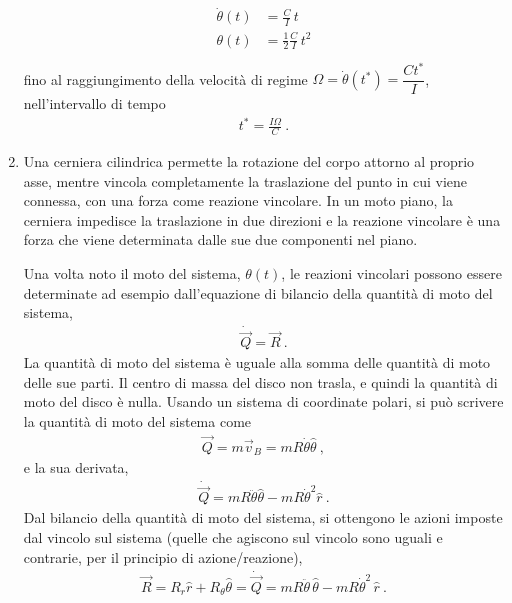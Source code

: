 \documentclass[letterpaper,10pt,italian]{jupyterBook}
\begin{document}
\begin{enumerate}
\begin{equation*}
\begin{split}
\begin{aligned}
     \dot{\theta}(t) & = \frac{C}{I} \, t \\
          \theta (t) & = \frac{1}{2} \frac{C}{I} \, t^2 \\
   \end{aligned}\end{split}
\end{equation*}
\sphinxAtStartPar
fino al raggiungimento della velocità di regime \(\Omega = \dot{\theta}(t^*) = \dfrac{C t^*}{I}\), nell’intervallo di tempo
\begin{equation*}
\begin{split}t^* = \frac{I \Omega}{C} \ .\end{split}
\end{equation*}
\item {} 
\sphinxAtStartPar
Una cerniera cilindrica permette la rotazione del corpo attorno al proprio asse, mentre vincola completamente la traslazione del punto in cui viene connessa, con una forza come reazione vincolare. In un moto piano, la cerniera impedisce la traslazione in due direzioni e la reazione vincolare è una forza che viene determinata dalle sue due componenti nel piano.

\sphinxAtStartPar
Una volta noto il moto del sistema, \(\theta(t)\), le reazioni vincolari possono essere determinate ad esempio dall’equazione di bilancio della quantità di moto del sistema,
\begin{equation*}
\begin{split}\dot{\vec{Q}} = \vec{R} \ .\end{split}
\end{equation*}
\sphinxAtStartPar
La quantità di moto del sistema è uguale alla somma delle quantità di moto delle sue parti. Il centro di massa del disco non trasla, e quindi la quantità di moto del disco è nulla. Usando un sistema di coordinate polari, si può scrivere la quantità di moto del sistema come
\begin{equation*}
\begin{split}\vec{Q} = m \vec{v}_B = m R \dot{\theta} \hat{\theta} \ ,\end{split}
\end{equation*}
\sphinxAtStartPar
e la sua derivata,
\begin{equation*}
\begin{split}\dot{\vec{Q}} = m R \ddot{\theta} \hat{\theta} - m R \dot{\theta}^2 \hat{r} \ .\end{split}
\end{equation*}
\sphinxAtStartPar
Dal bilancio della quantità di moto del sistema, si ottengono le azioni imposte dal vincolo sul sistema (quelle che agiscono sul vincolo sono uguali e contrarie, per il principio di azione/reazione),
\begin{equation*}
\begin{split}\vec{R} = R_r \hat{r} + R_{\theta} \hat{\theta} = \dot{\vec{Q}} = m R \ddot{\theta} \, \hat{\theta} - m R \dot{\theta}^2 \, \hat{r} \ .\end{split}
\end{equation*}
\end{enumerate}
\end{document}
